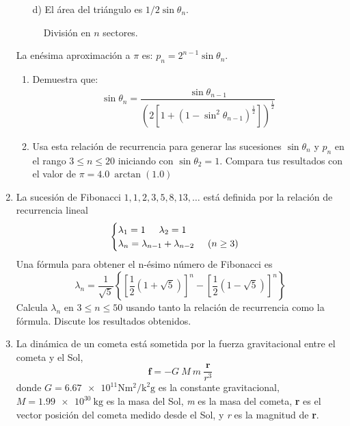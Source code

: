 \begin{enumerate}
\begin{enumerate}
\item[d)] El área del triángulo es $1/2 \sin \theta_{n}$.
\end{enumerate}
\begin{figure}[H]
\centering

\caption{División en $n$ sectores.}
\end{figure}
La enésima aproximación a $\pi$ es: $p_{n}= 2^{n-1} \sin \theta_{n}$.
\begin{enumerate}
\item Demuestra que:
\begin{align*}
\sin \theta_{n} = \dfrac{\sin \theta_{n - 1}}{\left( 2 \left[ 1 + (1 - \sin^{2}\theta_{n - 1})^{\frac{1}{2}} \right] \right)^{\frac{1}{2}}}
\end{align*}
\item Usa esta relación de recurrencia para generar las sucesiones $\sin \theta_{n}$ y $p_{n}$ en el rango $3 \leq n \leq 20$ iniciando con $\sin \theta_{2} = 1$. Compara tus resultados con el valor de $\pi = 4.0 \: \arctan(1.0)$
\end{enumerate}
\item La sucesión de Fibonacci $1, 1, 2, 3, 5, 8, 13,\ldots$ está definida por la relación de recurrencia lineal
\begin{equation*}
\begin{cases}
\lambda_{1} = 1 \hspace{0.5cm} \lambda_{2}= 1 \\
\lambda_{n} = \lambda_{n - 1} + \lambda_{n - 2} \hspace{0.5cm} (n \geq 3)
\end{cases}
\end{equation*}
Una fórmula para obtener el n-ésimo número de Fibonacci es
\[ \lambda_{n} = \dfrac{1}{\sqrt{5}} \left\lbrace \left[ \dfrac{1}{2} (1 + \sqrt{5}) \right]^{n} - \left[ \dfrac{1}{2} (1 - \sqrt{5}) \right]^{n} \right\rbrace \]
Calcula $\lambda_{n}$ en $3\leq n \leq 50$ usando tanto la relación de recurrencia como la fórmula. Discute los resultados obtenidos.
\item La dinámica de un cometa está sometida por la fuerza gravitacional entre el cometa y el Sol, 
\[ \textbf{f} = -G \: M \: m \:  \dfrac{\textbf{r}}{r^{3}} \]
donde $ G= \num{6.67e11} \si{\newton\square\meter\per\square\kilo\gram}$ es la constante gravitacional, $M = \SI{1.99e30}{\kilo\gram}$ es la masa del Sol, \textit{m} es la masa del cometa, \textbf{r} es el vector posición del cometa medido desde el Sol, y \textit{r} es la magnitud de \textbf{r}.
\par

\end{enumerate}
